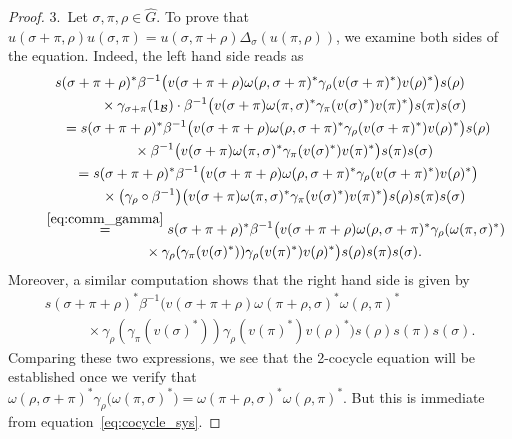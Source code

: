 \documentclass[pdftex]{sigma}
\numberwithin{equation}{section}
\newcommand*{\alg}{\mathcal}		%
\newcommand*{\one}{1}				%
\newcommand*{\aB}{\alg{B}} 			%
\begin{document}
\begin{proof}
3.~Let $\sigma, \pi, \rho \in \hat G$.
	To prove that $u(\sigma + \pi, \rho) u(\sigma, \pi)
	= u(\sigma, \pi + \rho) \Delta_\sigma ( u(\pi, \rho) )$, we examine both sides of the equation.
	Indeed, the left hand side reads as
	\begin{gather*}
s(\sigma + \pi + \rho)^* \beta^{-1}\big( v(\sigma + \pi + \rho) \omega(\rho,\sigma + \pi)^* \gamma_\rho (v(\sigma + \pi)^* ) v(\rho)^* \big) s(\rho)
		\\
\ \qquad\quad {}\times \gamma_{\sigma + \pi}(\one_\aB) \cdot \beta^{-1}\big( v(\sigma + \pi) \omega(\pi,\sigma)^* \gamma_\pi (v(\sigma)^* ) v(\pi)^*\big) s(\pi) s(\sigma)
		\\
\ \qquad{} =
		 s(\sigma + \pi + \rho)^* \beta^{-1}\big( v(\sigma + \pi + \rho) \omega(\rho,\sigma + \pi)^* \gamma_\rho (v(\sigma + \pi)^* ) v(\rho)^* \big) s(\rho)
		\\
\ \qquad\quad {} \times \beta^{-1}\big( v(\sigma + \pi) \omega(\pi,\sigma)^* \gamma_\pi (v(\sigma)^* ) v(\pi)^*\big) s(\pi) s(\sigma)
		\\
\ \qquad {} = s(\sigma + \pi + \rho)^* \beta^{-1}\big( v(\sigma + \pi + \rho) \omega(\rho,\sigma + \pi)^* \gamma_\rho (v(\sigma + \pi)^* ) v(\rho)^* \big)
		\\
\ \qquad \quad {}\times \big(\gamma_\rho \circ \beta^{-1} \big) \big( v(\sigma + \pi) \omega(\pi,\sigma)^* \gamma_\pi (v(\sigma)^* ) v(\pi)^*\big) s(\rho) s(\pi) s(\sigma)
		\\
\qquad{} \overset{\eqref{eq:comm_gamma}} {=}
		 s(\sigma + \pi + \rho)^* \beta^{-1}\big( v(\sigma + \pi + \rho) \omega(\rho,\sigma + \pi)^* \gamma_\rho ( \omega(\pi,\sigma)^* )
		\\
\ \qquad \quad {} \times \gamma_\rho ( \gamma_\pi ( v(\sigma)^* ) ) \gamma_\rho ( v(\pi)^* ) v(\rho)^* \big) s(\rho) s(\pi) s(\sigma).
	\end{gather*}
	Moreover, a similar computation shows that the right hand side is given by
	\begin{gather*}
	 s(\sigma + \pi +\rho)^* \beta^{-1}\big( v(\sigma + \pi + \rho) \omega(\pi + \rho,\sigma)^* \omega(\rho,\pi)^*
		\\			
\qquad \quad{}\times \gamma_\rho ( \gamma_\pi ( v(\sigma)^* ) ) \gamma_\rho ( v(\pi)^* ) v(\rho)^* \big) s(\rho) s(\pi) s(\sigma).	
	\end{gather*}
	Comparing these two expressions, we see that the 2-cocycle equation will be established once we verify that $\omega(\rho,\sigma + \pi)^* \gamma_\rho\big( \omega(\pi,\sigma)^* \big)= \omega(\pi + \rho,\sigma)^* \omega(\rho,\pi)^*$.
	But this is immediate from equation~\eqref{eq:cocycle_sys}.
\end{proof}
\end{document}
